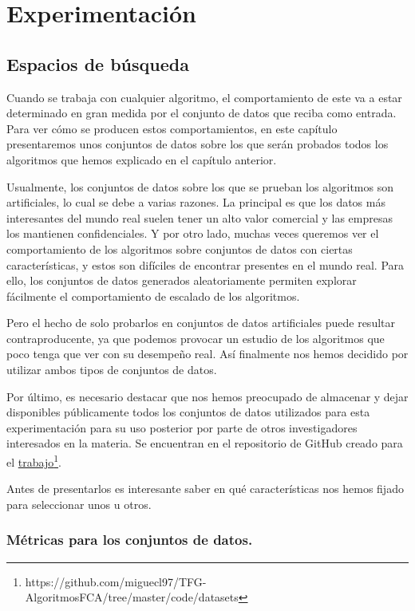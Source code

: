 \documentclass[oneside,openright,titlepage,numbers=noenddot,openany,headinclude,footinclude=true,
cleardoublepage=empty,abstractoff,BCOR=5mm,paper=a4,fontsize=12pt,main=spanish]{scrreprt}
\begin{document}
\part{Experimentación}

\chapter{Espacios de búsqueda}
   \label{chap:5}
Cuando se trabaja con cualquier algoritmo, el comportamiento de este va a estar determinado en gran medida por el conjunto de datos que reciba como entrada.  Para ver cómo se producen estos comportamientos, en este capítulo presentaremos unos conjuntos de datos sobre los que serán probados todos los algoritmos que hemos explicado en el capítulo anterior. 

Usualmente, los conjuntos de datos sobre los que se prueban los algoritmos son artificiales, lo cual se debe a varias razones. La principal es que los datos más interesantes del mundo real suelen tener un alto valor comercial y las empresas los mantienen confidenciales. Y por otro lado, muchas veces queremos ver el comportamiento de los algoritmos sobre conjuntos de datos con ciertas características, y estos son difíciles de encontrar presentes en el mundo real. Para ello, los conjuntos de datos generados aleatoriamente permiten explorar fácilmente el comportamiento de escalado de los algoritmos.

Pero el hecho de solo probarlos en conjuntos de datos artificiales puede resultar contraproducente, ya que podemos provocar un estudio de los algoritmos que poco tenga que ver con su desempeño real. Así finalmente nos hemos decidido por utilizar ambos tipos de conjuntos de datos.

Por último, es necesario destacar que nos hemos preocupado de almacenar y dejar disponibles públicamente todos los conjuntos de datos utilizados para esta experimentación para su uso posterior por parte de otros investigadores interesados en la materia. Se encuentran en el repositorio de GitHub creado para el \href{https://github.com/miguecl97/TFG-AlgoritmosFCA/tree/master/code/datasets}{trabajo}\footnote{https://github.com/miguecl97/TFG-AlgoritmosFCA/tree/master/code/datasets}.

Antes de presentarlos es interesante saber en qué características nos hemos fijado para seleccionar unos u otros.


\section{Métricas para los conjuntos de datos.}
\end{document}
